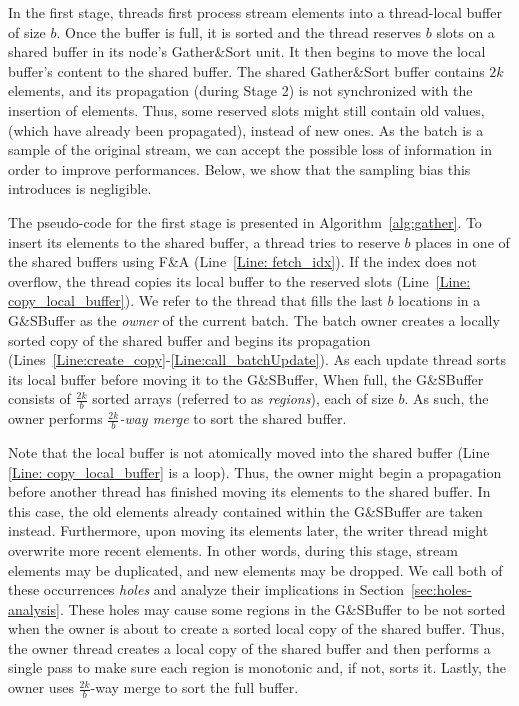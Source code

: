 In the first stage, threads first process stream elements into a thread-local buffer of size $b$. Once the buffer is full, it is sorted and the thread reserves $b$ slots on a shared buffer in its node's Gather\&Sort unit. It then begins to move the local buffer's content to the shared buffer. The shared Gather\&Sort buffer contains $2k$ elements, and its propagation (during Stage 2) is not synchronized with the insertion of elements. Thus, some reserved slots might still contain old values, (which have already been propagated), instead of new ones. As the batch is a sample of the original stream, we can accept the possible loss of information in order to improve performances. Below, we show that the sampling bias this introduces is negligible.

The pseudo-code for the first stage is presented in Algorithm~\ref{alg:gather}. To insert its elements to the shared buffer, a thread tries to reserve $b$ places in one of the shared buffers using F\&A (Line~\ref{Line: fetch_idx}). If the index does not overflow, the thread copies its local buffer to the reserved slots (Line~\ref{Line: copy_local_buffer}). We refer to the thread that fills the last $b$ locations in a G\&SBuffer as the \emph{owner} of the current batch. The batch owner creates a locally sorted copy of the shared buffer and begins its propagation (Lines~\ref{Line:create_copy}-\ref{Line:call_batchUpdate}). As each update thread sorts its local buffer before moving it to the G\&SBuffer, When full, the G\&SBuffer consists of $\frac{2k}{b}$ sorted arrays (referred to as \emph{regions}), each of size $b$. As such, the owner performs \emph{$\frac{2k}{b}$-way merge} to sort the shared buffer. 

Note that the local buffer is not atomically moved into the shared buffer (Line \ref{Line: copy_local_buffer} is a loop). Thus, the owner might begin a propagation before another thread has finished moving its elements to the shared buffer. In this case, the old elements already contained within the G\&SBuffer are taken instead. Furthermore, upon moving its elements later, the writer thread might overwrite more recent elements. In other words, during this stage, stream elements may be duplicated, and new elements may be dropped. We call both of these occurrences \emph{holes} and analyze their implications in Section~\ref{sec:holes-analysis}. These holes may cause some regions in the G\&SBuffer to be not sorted when the owner is about to create a sorted local copy of the shared buffer. Thus, the owner thread creates a local copy of the shared buffer and then performs a single pass to make sure each region is monotonic and, if not, sorts it. Lastly, the owner uses $\frac{2k}{b}$-way merge to sort the full buffer. 


